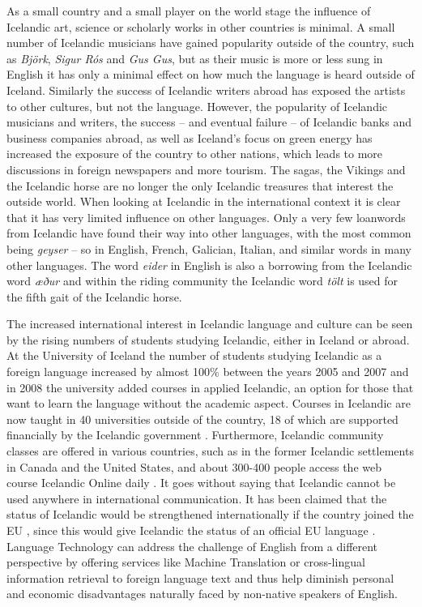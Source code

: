 \begin{multicols}{2}
As a small country and a small player on the world stage the influence of Icelandic art, science or scholarly works in other countries is minimal. A small number of Icelandic musicians have gained popularity outside of the country, such as \textit{Björk}, \textit{Sigur Rós} and \textit{Gus Gus}, but as their music is more or less sung in English it has only a minimal effect on how much the language is heard outside of Iceland. Similarly the success of Icelandic writers abroad has exposed the artists to other cultures, but not the language. However, the popularity of Icelandic musicians and writers, the success -- and eventual failure -- of Icelandic banks and business companies abroad, as well as Iceland’s focus on green energy has increased the exposure of the country to other nations, which leads to more discussions in foreign newspapers and more tourism. The sagas, the Vikings and the Icelandic horse are no longer the only Icelandic treasures that interest the outside world.
When looking at Icelandic in the international context it is clear that it has very limited influence on other languages. Only a very few loanwords from Icelandic have found their way into other languages, with the most common being \textit{geyser} -- so in English, French, Galician, Italian, and similar words in many other languages. The word \textit{eider} in English is also a borrowing from the Icelandic word \textit{æður} and within the riding community the Icelandic word \textit{tölt} is used for the fifth gait of the Icelandic horse.

The increased international interest in Icelandic language and culture can be seen by the rising numbers of students studying Icelandic, either in Iceland or abroad. At the University of Iceland the number of students studying Icelandic as a foreign language increased by almost 100\% between the years 2005 and 2007 and in 2008 the university added courses in applied Icelandic, an option for those that want to learn the language without the academic aspect. Courses in Icelandic are now taught in 40 universities outside of the country, 18 of which are supported financially by the Icelandic government \cite{isl1}.  Furthermore, Icelandic community classes are offered in various countries, such as in the former Icelandic settlements in Canada and the United States, and about 300-400 people access the web course Icelandic Online daily \cite{iol1}. 
It goes without saying that Icelandic cannot be used anywhere in international communication. It has been claimed that the status of Icelandic would be strengthened internationally if the country joined the EU \cite{vis2}, since this would give Icelandic the status of an official EU language \cite{enl1}. Language Technology can address the challenge of English from a different perspective by offering services like Machine Translation or cross-lingual information retrieval to foreign language text and thus help diminish personal and economic disadvantages naturally faced by non-native speakers of English.


\end{multicols}

